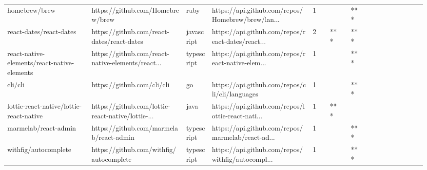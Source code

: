 \begin{tabular}{llllrlllllllllllll}
homebrew/brew                                      &                   https://github.com/Homebrew/brew &              ruby &  https://api.github.com/repos/Homebrew/brew/lan... &       1 &         &        &           &            *** &                 &        &           &           &          &          &       &              &          \\
react-dates/react-dates                            &         https://github.com/react-dates/react-dates &        javascript &  https://api.github.com/repos/react-dates/react... &       2 &         &    *** &           &            *** &                 &        &           &           &          &          &       &              &          \\
react-native-elements/react-native-elements        &  https://github.com/react-native-elements/react... &        typescript &  https://api.github.com/repos/react-native-elem... &       1 &         &        &           &            *** &                 &        &           &           &          &          &       &              &          \\
cli/cli                                            &                         https://github.com/cli/cli &                go &     https://api.github.com/repos/cli/cli/languages &       1 &         &        &           &            *** &                 &        &           &           &          &          &       &              &          \\
lottie-react-native/lottie-react-native            &  https://github.com/lottie-react-native/lottie-... &              java &  https://api.github.com/repos/lottie-react-nati... &       1 &         &    *** &           &                &                 &        &           &           &          &          &       &              &          \\
marmelab/react-admin                               &            https://github.com/marmelab/react-admin &        typescript &  https://api.github.com/repos/marmelab/react-ad... &       1 &         &        &           &            *** &                 &        &           &           &          &          &       &              &          \\
withfig/autocomplete                               &            https://github.com/withfig/autocomplete &        typescript &  https://api.github.com/repos/withfig/autocompl... &       1 &         &        &           &            *** &                 &        &           &           &          &          &       &              &          \\

\end{tabular}

